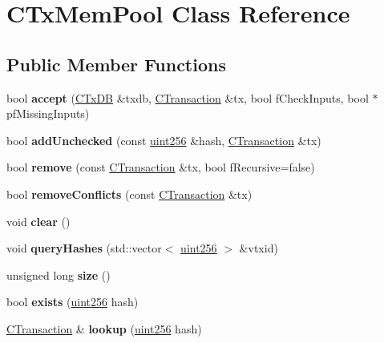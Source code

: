 \hypertarget{class_c_tx_mem_pool}{}\section{C\+Tx\+Mem\+Pool Class Reference}
\label{class_c_tx_mem_pool}
\subsection*{Public Member Functions}
\begin{DoxyCompactItemize}
\item 
\mbox{\label{class_c_tx_mem_pool_a8f9fd52b0c330925638cf01c0cd28701}} 
bool {\bfseries accept} (\mbox{\hyperlink{class_c_tx_d_b}{C\+Tx\+DB}} \&txdb, \mbox{\hyperlink{class_c_transaction}{C\+Transaction}} \&tx, bool f\+Check\+Inputs, bool $\ast$pf\+Missing\+Inputs)
\item 
\mbox{\label{class_c_tx_mem_pool_a1203ac5cf3bdb88af4922705afad555d}} 
bool {\bfseries add\+Unchecked} (const \mbox{\hyperlink{classuint256}{uint256}} \&hash, \mbox{\hyperlink{class_c_transaction}{C\+Transaction}} \&tx)
\item 
\mbox{\label{class_c_tx_mem_pool_a258e23e3a434045d522a8cebc5a039ce}} 
bool {\bfseries remove} (const \mbox{\hyperlink{class_c_transaction}{C\+Transaction}} \&tx, bool f\+Recursive=false)
\item 
\mbox{\label{class_c_tx_mem_pool_ab6f7c0b3ddb8383767d97d22103ffd9b}} 
bool {\bfseries remove\+Conflicts} (const \mbox{\hyperlink{class_c_transaction}{C\+Transaction}} \&tx)
\item 
\mbox{\label{class_c_tx_mem_pool_a6dba6bce4139392751321438a29b6b09}} 
void {\bfseries clear} ()
\item 
\mbox{\label{class_c_tx_mem_pool_a42fa7d41a45562d02e356f2e7708bb02}} 
void {\bfseries query\+Hashes} (std\+::vector$<$ \mbox{\hyperlink{classuint256}{uint256}} $>$ \&vtxid)
\item 
\mbox{\label{class_c_tx_mem_pool_a867f7b452141770f3b2e8697fb3513d8}} 
unsigned long {\bfseries size} ()
\item 
\mbox{\label{class_c_tx_mem_pool_adba06e79be4a1a092dd2db8290733be7}} 
bool {\bfseries exists} (\mbox{\hyperlink{classuint256}{uint256}} hash)
\item 
\mbox{\label{class_c_tx_mem_pool_ab0a9f0029f9038c42803e1057830def7}} 
\mbox{\hyperlink{class_c_transaction}{C\+Transaction}} \& {\bfseries lookup} (\mbox{\hyperlink{classuint256}{uint256}} hash)
\end{DoxyCompactItemize}
